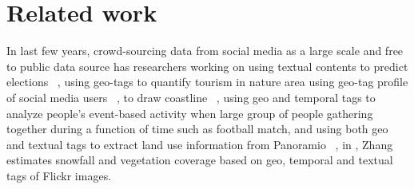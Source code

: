 \section{Related work}
In last few years, crowd-sourcing data from social media 
as a large scale and free to public data source
has  
researchers working on using textual contents to
predict elections ~\cite{A Multifaceted Approach to Social Multimedia-based Prediction of Elections},
using geo-tags to quantify
tourism in nature area using geo-tag profile of social media users ~\cite{Using social media to quantify nature-based tourism and recreation},
to draw coastline ~\cite{Can geo-tags on flickr draw coastlines?}, 
using geo and temporal tags to analyze people's event-based activity when large group of people gathering together during a function of time such as football match,
and using both geo and textual tags to 
extract land use information from Panoramio ~\cite{Analysis of panoramio photo tags in order to extract land use information, Towards Better Land Cover Classification Using Geo-tagged Photographs},
in , Zhang \etal estimates  snowfall and vegetation coverage 
based on geo, temporal and textual tags of Flickr images.

